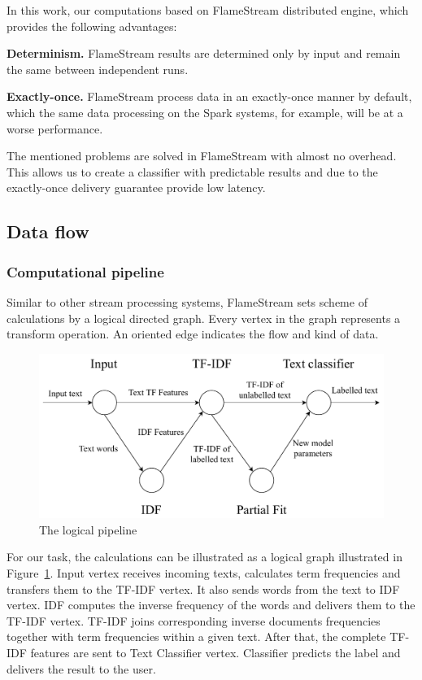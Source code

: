 In this work, our computations based on FlameStream \cite{kuralenok2018flamestream} distributed engine, which provides the following advantages:

\textbf{Determinism.} FlameStream results are determined only by input and remain the same between independent runs.

\textbf{Exactly-once.} FlameStream process data in an exactly-once manner by default, which the same data processing on the Spark systems, for example, will be at a worse performance.

The mentioned problems are solved in FlameStream with almost no overhead. This allows us to create a classifier with predictable results and due to the exactly-once delivery guarantee provide low latency.

\subsection{Data flow \label{DF}}

\subsubsection{Computational pipeline}

Similar to other stream processing systems, FlameStream sets scheme of calculations by a logical directed graph. Every vertex in the graph represents a transform operation. An oriented edge indicates the flow and kind of data.

\begin{figure}[htbp]
  \centering
  \includegraphics[scale=0.48]{pics/logical-graph}
  \caption{The logical pipeline}
  \label {logical_graph}
\end{figure}

For our task, the calculations can be illustrated as a logical graph illustrated in Figure~\ref{logical_graph}. Input vertex receives incoming texts, calculates term frequencies and transfers them to the TF-IDF vertex. It also sends words from the text to IDF vertex. IDF computes the inverse frequency of the words and delivers them to the TF-IDF vertex. TF-IDF joins corresponding inverse documents frequencies together with term frequencies within a given text. After that, the complete TF-IDF features are sent to Text Classifier vertex. Classifier predicts the label and delivers the result to the user.

